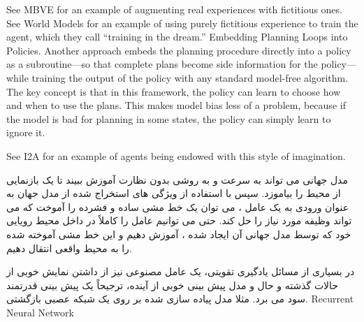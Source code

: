See MBVE for an example of augmenting real experiences with fictitious ones.
See World Models for an example of using purely fictitious experience to train the agent, which they call “training in the dream.”
Embedding Planning Loops into Policies. Another approach embeds the planning procedure directly into a policy as a subroutine—so that complete plans become side information for the policy—while training the output of the policy with any standard model-free algorithm. The key concept is that in this framework, the policy can learn to choose how and when to use the plans. This makes model bias less of a problem, because if the model is bad for planning in some states, the policy can simply learn to ignore it.

See I2A for an example of agents being endowed with this style of imagination.


مدل جهانی می تواند به سرعت و به روشی بدون نظارت آموزش ببیند تا یک بازنمایی از محیط را بیاموزد. سپس با استفاده از ویژگی های استخراج شده از مدل جهان به عنوان ورودی به یک عامل ، می توان یک خط مشی ساده و فشرده را آموخت که می تواند وظیفه مورد نیاز را حل کند. حتی می توانیم عامل را کاملاً در داخل محیط رویایی خود که توسط مدل جهانی آن ایجاد شده ، آموزش دهیم و این خط مشی آموخته شده را به محیط واقعی انتقال دهیم.


در بسیاری از مسائل یادگیری تقویتی، یک عامل مصنوعی نیز از داشتن نمایش خوبی از حالات گذشته و حال و مدل پیش بینی خوبی از آینده، ترجیحاً یک پیش بینی قدرتمند سود می برد. مثلا مدل پیاده سازی شده بر روی یک شبکه عصبی بازگشتی.
 {Recurrent Neural Network}


